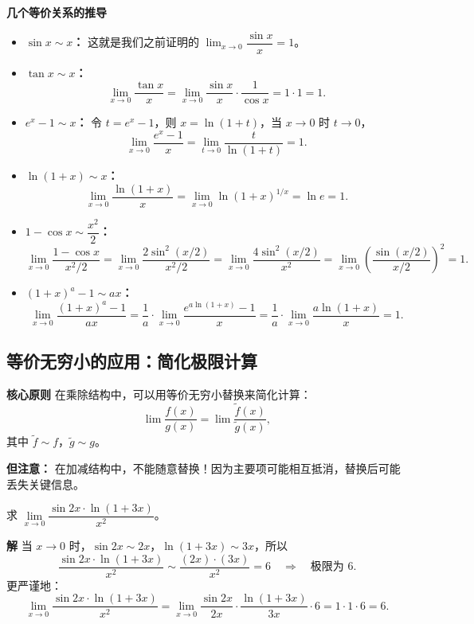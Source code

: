 \documentclass{ctexart}
\newenvironment{custom}[1]{\par\noindent \textbf{#1}\quad}{\par\vspace{1em}}
\begin{document}
\begin{custom}{几个等价关系的推导}

\begin{itemize}
\item \textbf{\(\sin x \sim x\)：} 这就是我们之前证明的 \(\lim_{x \to 0} \dfrac{\sin x}{x} = 1\)。

\item \textbf{\(\tan x \sim x\)：} 
\[
\lim_{x \to 0} \dfrac{\tan x}{x} = \lim_{x \to 0} \dfrac{\sin x}{x} \cdot \dfrac{1}{\cos x} = 1 \cdot 1 = 1.
\]

\item \textbf{\(e^x - 1 \sim x\)：} 令 \(t = e^x - 1\)，则 \(x = \ln(1+t)\)，当 \(x \to 0\) 时 \(t \to 0\)，
\[
\lim_{x \to 0} \dfrac{e^x - 1}{x} = \lim_{t \to 0} \dfrac{t}{\ln(1+t)} = 1.
\]

\item \textbf{\(\ln(1+x) \sim x\)：} 
\[
\lim_{x \to 0} \dfrac{\ln(1+x)}{x} = \lim_{x \to 0} \ln(1+x)^{1/x} = \ln e = 1.
\]

\item \textbf{\(1 - \cos x \sim \dfrac{x^2}{2}\)：} 
\[
\lim_{x \to 0} \dfrac{1 - \cos x}{x^2/2} = \lim_{x \to 0} \dfrac{2 \sin^2(x/2)}{x^2/2} = \lim_{x \to 0} \dfrac{4 \sin^2(x/2)}{x^2} = \lim_{x \to 0} \left(\dfrac{\sin(x/2)}{x/2}\right)^2 = 1.
\]

\item \textbf{\((1+x)^a - 1 \sim ax\)：} 
\[
\lim_{x \to 0} \dfrac{(1+x)^a - 1}{ax} = \dfrac{1}{a} \cdot \lim_{x \to 0} \dfrac{e^{a\ln(1+x)} - 1}{x} = \dfrac{1}{a} \cdot \lim_{x \to 0} \dfrac{a\ln(1+x)}{x} = 1.
\]
\end{itemize}
\end{custom}

\subsection{等价无穷小的应用：简化极限计算}

\begin{custom}{核心原则}
在乘除结构中，可以用等价无穷小替换来简化计算：
\[
\lim \dfrac{f(x)}{g(x)} = \lim \dfrac{\tilde{f}(x)}{\tilde{g}(x)},
\]
其中 \(\tilde{f} \sim f\)，\(\tilde{g} \sim g\)。

\textbf{但注意：} 在加减结构中，不能随意替换！因为主要项可能相互抵消，替换后可能丢失关键信息。
\end{custom}

\begin{example}[乘除结构中的替换]
求 \(\lim\limits_{x \to 0} \dfrac{\sin 2x \cdot \ln(1+3x)}{x^2}\)。
\end{example}
\begin{custom}{解}
当 \(x \to 0\) 时，\(\sin 2x \sim 2x\)，\(\ln(1+3x) \sim 3x\)，所以
\[
\dfrac{\sin 2x \cdot \ln(1+3x)}{x^2} \sim \dfrac{(2x) \cdot (3x)}{x^2} = 6 \quad \Rightarrow \quad \text{极限为 } 6.
\]
更严谨地：
\[
\lim_{x \to 0} \dfrac{\sin 2x \cdot \ln(1+3x)}{x^2} = \lim_{x \to 0} \dfrac{\sin 2x}{2x} \cdot \dfrac{\ln(1+3x)}{3x} \cdot 6 = 1 \cdot 1 \cdot 6 = 6.
\]
\end{custom}
\end{document}
